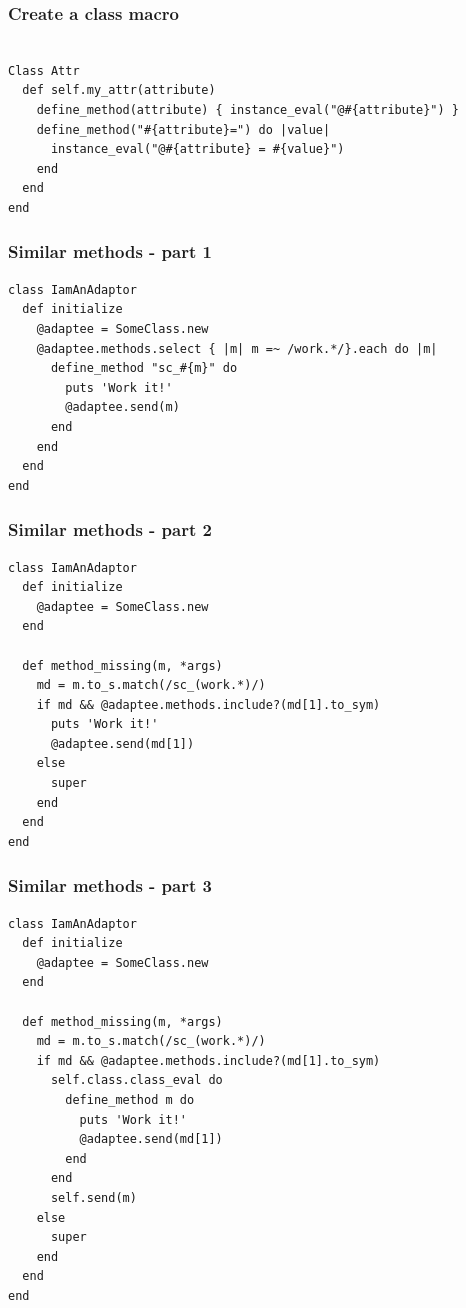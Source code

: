 \begin{frame}[fragile]\frametitle{Create a class macro}
\begin{lstlisting}

Class Attr
  def self.my_attr(attribute)
    define_method(attribute) { instance_eval("@#{attribute}") }
    define_method("#{attribute}=") do |value|
      instance_eval("@#{attribute} = #{value}")
    end
  end
end

\end{lstlisting}
\end{frame}
\begin{frame}[fragile]\frametitle{Similar methods - part 1}
\begin{lstlisting}
class IamAnAdaptor
  def initialize
    @adaptee = SomeClass.new
    @adaptee.methods.select { |m| m =~ /work.*/}.each do |m|
      define_method "sc_#{m}" do
        puts 'Work it!'
        @adaptee.send(m)
      end
    end
  end
end
\end{lstlisting}
\end{frame}
\begin{frame}[fragile]\frametitle{Similar methods - part 2}
\begin{lstlisting}
class IamAnAdaptor
  def initialize
    @adaptee = SomeClass.new
  end

  def method_missing(m, *args)
    md = m.to_s.match(/sc_(work.*)/)
    if md && @adaptee.methods.include?(md[1].to_sym)
      puts 'Work it!'
      @adaptee.send(md[1])
    else
      super
    end
  end
end
\end{lstlisting}
\end{frame}
\begin{frame}[fragile]\frametitle{Similar methods - part 3}
\begin{lstlisting}
class IamAnAdaptor
  def initialize
    @adaptee = SomeClass.new
  end

  def method_missing(m, *args)
    md = m.to_s.match(/sc_(work.*)/)
    if md && @adaptee.methods.include?(md[1].to_sym)
      self.class.class_eval do
        define_method m do
          puts 'Work it!'
          @adaptee.send(md[1])
        end
      end
      self.send(m)
    else
      super
    end
  end
end
\end{lstlisting}
\end{frame}

